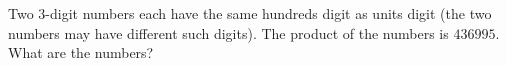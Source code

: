 Two \(3\)-digit numbers each have the same hundreds digit as units digit (the two numbers may have different such digits). The product of the numbers is \(436995\). What are the numbers?
